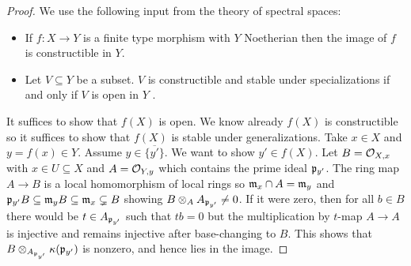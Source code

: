 \begin{proof}
    We use the following input from the theory of spectral spaces: 
    \begin{itemize}
        \item If $f:X\to Y$ is a finite type morphism with $Y$ Noetherian then the image of $f$ is constructible in $Y$\cite[\href{https://stacks.math.columbia.edu/tag/054K}{Tag 054K}]{stacks-project}.
        \item Let $V\subseteq Y$ be a subset. $V$ is constructible and stable under specializations if and only if $V$ is open in $Y$ \cite[\href{https://stacks.math.columbia.edu/tag/0542}{Tag 0542}]{stacks-project}. 
    \end{itemize}
    It suffices to show that $f(X)$ is open. We know already $f(X)$ is constructible so it suffices to show that $f(X)$ is stable under generalizations. Take $x\in X$ and $y=f(x)\in Y$. Assume $y\in\overline{\{y'\}}$. We want to show $y'\in f(X)$. Let $B=\mathcal{O}_{X,x}$ with $x\in U\subseteq X$ and $A=\mathcal{O}_{Y,y}$ which contains the prime ideal $\mathfrak{p}_{y'}$. The ring map $A\to B$ is a local homomorphism of local rings so $\mathfrak{m}_{x}\cap A=\mathfrak{m}_{y}$ and $\mathfrak{p}_{y'}B\subseteq\mathfrak{m}_{y}B\subseteq\mathfrak{m}_{x}\subsetneq B$ showing $B\otimes_{A}A_{\mathfrak{p}_{y'}}\neq0$. If it were zero, then for all $b\in B$ there would be $t\in A_{\mathfrak{p}_{y'}}$ such that $tb=0$ but the multiplication by $t$-map $A\to A$ is injective and remains injective after base-changing to $B$. This shows that $B\otimes_{A_{\mathfrak{p}_{y'}}}\kappa(\mathfrak{p}_{y'})$ is nonzero, and hence lies in the image. 
\end{proof}